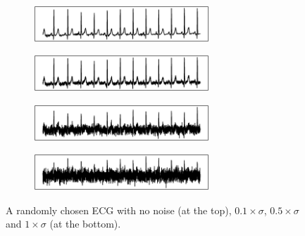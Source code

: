 \begin{figure}[hp]
 
     \begin{subfigure}[b]{0.99\textwidth}
        \centering
        \includegraphics[trim=95 18 75 20, clip, width=0.725\textwidth]{images/no_noise.eps}
        \label{fig:nonoise}
     \end{subfigure}
     \hfill
     \begin{subfigure}[b]{0.99\textwidth}
        \centering
        \includegraphics[trim=95 18 75 20, clip, width=0.725\textwidth]{images/01_noise.eps}
        \label{fig:01noise}
     \end{subfigure}
     \hfill
      \begin{subfigure}[b]{0.99\textwidth}
        \centering
        \includegraphics[trim=95 18 75 20, clip, width=0.725\textwidth]{images/05_noise.eps}
        \label{fig:05noise}
     \end{subfigure}
        \hfill
      \begin{subfigure}[b]{0.99\textwidth}
        \centering
        \includegraphics[trim=95 18 75 20, clip, width=0.725\textwidth]{images/1_noise.eps}
        \label{fig:1noise}
     \end{subfigure}
    \caption{A randomly chosen ECG with no noise (at the top), $0.1\times\sigma$, $0.5\times\sigma$ and $1\times\sigma$ (at the bottom).
    }
    \label{fig:ecg_noise_ex}
\end{figure}

